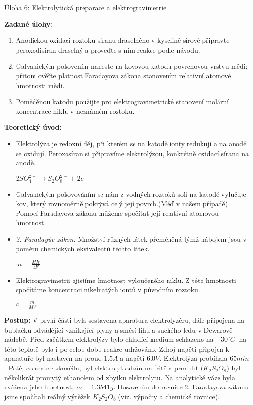 \documentclass[13pt, a4paper, twoside]{article}
\begin{document}
\begin{center}
    \huge
    Úloha 6: Elektrolytická preparace a elektrogravimetrie
    \vspace{7mm}
\end{center}
\onehalfspacing
\large \noindent
\textbf{Zadané úlohy:}
\begin{enumerate}
    \item Anodickou oxidací roztoku síranu draselného v kyselině sírové připravte peroxodisíran draselný a proveďte s ním reakce podle návodu.
    \item Galvanickým pokovením naneste na kovovou katodu povrchovou vrstvu mědi; přitom ověřte platnost Faradayova zákona stanovením relativní atomové hmotnosti mědi.
    \item Poměděnou katodu použijte pro elektrogravimetrické stanovení molární koncentrace niklu v neznámém roztoku.
\end{enumerate}

\textbf{Teoretický úvod:}
\begin{itemize}
    \item Elektrolýza je redoxní děj, při kterém se na katodě ionty redukují a na anodě se oxidují. Peroxosíran si připravíme elektrolýzou, konkrétně oxidací síranu na anodě.
    \begin{center}
        $2SO_4^{2-} \to S_2O_8^{2-}+2e^-$
    \end{center}
    \item Galvanickým pokovováním se nám z vodných roztoků solí na katodě vylučuje kov, který rovnoměrně pokrývá celý její povrch.(Měď v našem případě) Pomocí Faradayova zákonu můžeme spočítat její relativní atomovou hmotnost.
    \item \emph{2. Faradayův zákon:} Množství různých látek přeměněná týmž nábojem jsou v poměru chemických ekvivalentů těchto látek.
    \begin{center}
        \Large
        $m=\frac{MIt}{zF}$
    \end{center}
    \item Elektrogravimetrii zjistíme hmotnost vyloučeného niklu. Z této hmotnosti spočítáme koncentraci nikelnatých iontů v původním roztoku.
    \begin{center}
        \Large
        $c=\frac{m}{MV}$
    \end{center}
\end{itemize}
\textbf{Postup:}\newline
V první části byla sestavena aparatura elektrolyzéru, dále připojena na bublačku odvádějící vznikající plyny a  směsí lihu a suchého ledu v Dewarově nádobě. Před začátkem elektrolýzy bylo chladící medium schlazeno na $-30^{\circ} C$, na této teplotě bylo i po celou dobu reakce udržováno. Zdroj napětí připojen k aparatuře byl nastaven na proud $1.5 A$ a napětí $6.0V$. Elektrolýza probíhala $65min$. Poté, co reakce skončila, byl elektrolyt odsán na fritě a produkt ($K_2S_2O_8$) byl několikrát promytý ethanolem od zbytku elektrolytu. Na analytické váze byla zvážena jeho hmotnost, $m=1.3541g$. Dosazením do rovnice 2. Faradayova zákonu jsme spočítali reálný výtěžek $K_2S_2O_8$ (viz. výpočty a chemické rovnice).
\end{document}
